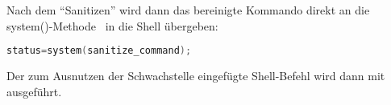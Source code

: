Nach dem "`Sanitizen"' wird dann das bereinigte Kommando direkt an die system()-Methode~\cite{SystemCall} in die Shell übergeben:

\begin{lstlisting}[firstnumber=402, language=C, caption=magick/delegate.c Aufruf system(),label={lst:lstlisting}]
  status=system(sanitize_command);
\end{lstlisting}
\vspace{5mm}

Der zum Ausnutzen der Schwachstelle eingefügte Shell-Befehl wird dann mit ausgeführt.
\newpage